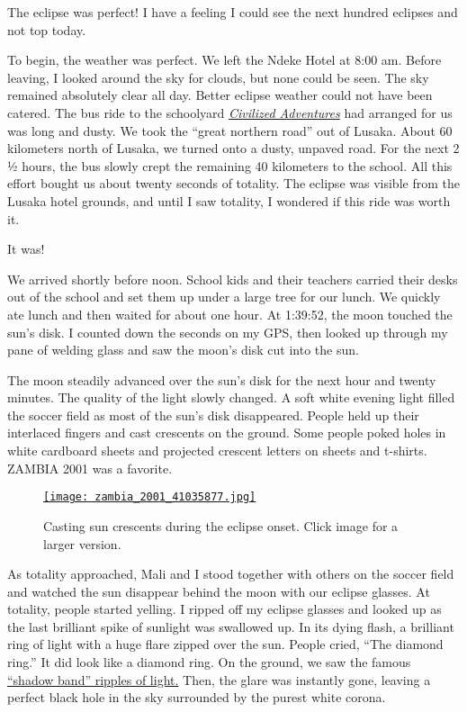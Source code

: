 The eclipse was perfect! I have a feeling I could see the next hundred
eclipses and not top today.

To begin, the weather was perfect. We left the Ndeke Hotel at 8:00 am.
Before leaving, I looked around the sky for clouds, but none could be
seen. The sky remained absolutely clear all day. Better eclipse weather
could not have been catered. The bus ride to the schoolyard
\emph{\href{https://ca.linkedin.com/company/civilized-adventures}{Civilized
Adventures}} had arranged for us was long and dusty. We took the ``great
northern road'' out of Lusaka. About 60 kilometers north of Lusaka, we
turned onto a dusty, unpaved road. For the next 2 ½ hours, the bus
slowly crept the remaining 40 kilometers to the school. All this effort
bought us about twenty seconds of totality. The eclipse was visible from
the Lusaka hotel grounds, and until I saw totality, I wondered if this
ride was worth it.

It was!

We arrived shortly before noon. School kids and their teachers carried
their desks out of the school and set them up under a large tree for our
lunch. We quickly ate lunch and then waited for about one hour. At
1:39:52, the moon touched the sun's disk. I counted down the seconds on
my GPS, then looked up through my pane of welding glass and saw the
moon's disk cut into the sun.

The moon steadily advanced over the sun's disk for the next hour and
twenty minutes. The quality of the light slowly changed. A soft white
evening light filled the soccer field as most of the sun's disk
disappeared. People held up their interlaced fingers and cast crescents
on the ground. Some people poked holes in white cardboard sheets and
projected crescent letters on sheets and t-shirts. ZAMBIA 2001 was a
favorite.

\begin{SCfigure}
\centering
\href{https://conceptcontrol.smugmug.com/Trips/Overseas/Zambia-Eclipse-Trip-1/i-Zx8CXwz/A}{\texttt{[image: zambia\_2001\_41035877.jpg]}}
\caption[Casting sun crescents during the eclipse onset]{Casting sun crescents during the eclipse onset. Click image for a
larger version.}
\label{fig:8074X1}
\end{SCfigure}

As totality approached, Mali and I stood together with others on the
soccer field and watched the sun disappear behind the moon with our
eclipse glasses. At totality, people started yelling. I ripped off my
eclipse glasses and looked up as the last brilliant spike of sunlight
was swallowed up. In its dying flash, a brilliant ring of light with a
huge flare zipped over the sun. People cried, ``The diamond ring.'' It
did look like a diamond ring. On the ground, we saw the famous \href{https://en.wikipedia.org/wiki/Shadow_bands}{``shadow band'' ripples of light.} Then, the glare was instantly gone, leaving
a perfect black hole in the sky surrounded by the purest white
corona.

